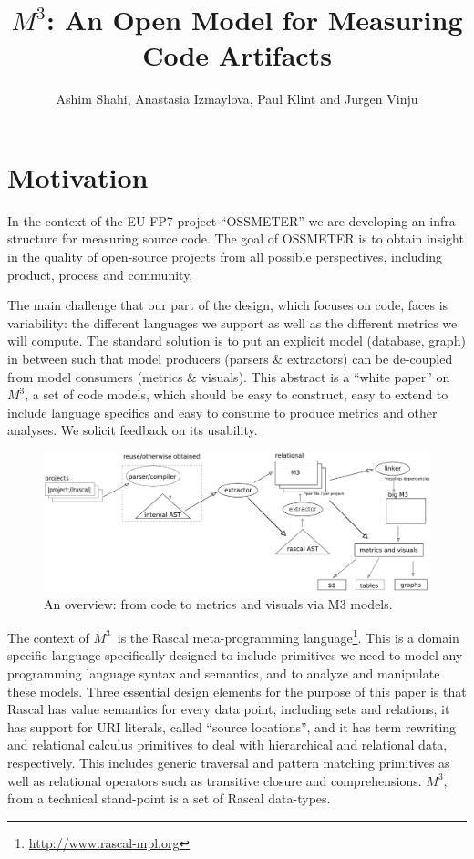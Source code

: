 \documentclass[a4]{IEEEtran}
\title{$M^3$: An Open Model for Measuring Code Artifacts}
\author{Ashim Shahi, Anastasia Izmaylova, Paul Klint and Jurgen Vinju}
\date{}
\newcommand{\mthree}{\ensuremath{M^3}}
\begin{document}
\maketitle

\section{Motivation}

In the context of the EU FP7 project ``OSSMETER'' we are developing an infra-structure for measuring source code. The goal of OSSMETER is to obtain insight in the quality of open-source projects from all possible perspectives, including product, process and community. 

The main challenge that our part of the design, which focuses on code, faces is variability: the different languages we support as well as the different metrics we will compute. The standard solution is to put an explicit model (database, graph) in between such that model producers (parsers \& extractors) can be de-coupled from model consumers (metrics \& visuals). This abstract is a ``white paper'' on \mthree, a set of code models, which should be easy to construct, easy to extend to include language specifics and easy to consume to produce metrics and other analyses. We solicit feedback on its usability.

\begin{figure}[t]
\includegraphics[width=\columnwidth]{m3}
\caption{An overview: from code to metrics and visuals via M3 models.}
\end{figure}

The context of \mthree\ is the Rascal meta-programming language\footnote{\url{http://www.rascal-mpl.org}}. This is a domain specific language specifically designed to include primitives we need to model any programming language syntax and semantics, and to analyze and manipulate these models. Three essential design elements for the purpose of this paper is that Rascal has value semantics for every data point, including sets and relations, it has support for URI literals, called ``source locations'', and it has term rewriting and relational calculus primitives to deal with hierarchical and relational data, respectively. This includes generic traversal and pattern matching primitives as well as relational operators such as transitive closure and comprehensions. \mthree$\!\!\!\!$,~ from a technical stand-point is a set of Rascal data-types.
\end{document}
